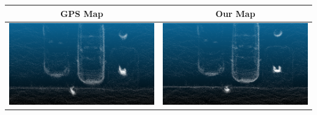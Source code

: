 \begin{table}[h]
    \centering
    {\small
        \begin{tabular}{cc}
            \textbf{GPS Map}                                                                       & \textbf{Our Map} \\
            \hline \hline
            \includegraphics[width=0.44\linewidth]{images/map_compare/kitti/cars/capture_gps.png}  &
            \includegraphics[width=0.44\linewidth]{images/map_compare/kitti/cars/capture_ours.png}                    \\


\end{tabular}}
\end{table}

